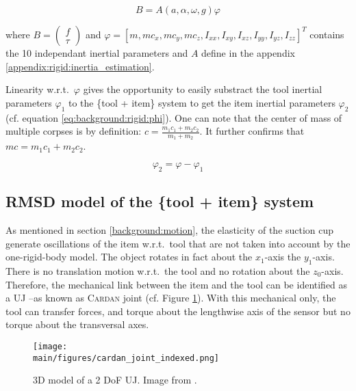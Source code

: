 \documentclass[/home/francois/latex/report/main.tex]{subfiles}
\begin{document}
\begin{equation}
  \label{background:eq:inertia_estimation}
B = A(a, \alpha, \omega, g) \varphi
\end{equation}

where $B =  \begin{pmatrix} f \\ \tau \end{pmatrix}$ and $\varphi = [m, m c_x, m c_y, m c_z, I_{xx}, I_{xy}, I_{xz}, I_{yy}, I_{yz}, I_{zz}]^T$ contains the 10 independant inertial parameters and $A$ define in the appendix \ref{appendix:rigid:inertia_estimation}.

Linearity w.r.t.\ $\varphi$ gives the opportunity to easily substract the tool inertial parameters $\varphi_1$ to the \{tool + item\} system to get the item inertial parameters $\varphi_2$ (cf. equation \ref{eq:background:rigid:phi}). One can note that the center of mass of multiple corpses is by definition: $c = \frac{m_1 c_1 + m_2 c_2}{m_1 + m_2}$. It further confirms that $mc = m_1 c_1 + m_2 c_2$.

\begin{equation}
  \label{eq:background:rigid:phi}
  \varphi_2 = \varphi - \varphi_{1}
\end{equation}


\subsection{\ac{RMSD} model of the \{tool + item\} system}

As mentioned in section \ref{background:motion}, the elasticity of the suction cup generate oscillations of the item w.r.t.\ tool that are not taken into account by the one-rigid-body model. The object rotates in fact about the $x_1$-axis the $y_1$-axis. There is no translation motion w.r.t.\ the tool and no rotation about the $z_0$-axis. Therefore, the mechanical link between the item and the tool can be identified as a \ac{UJ} –as known as \textsc{Cardan} joint (cf. Figure \ref{fig:background:cardan}). With this mechanical only, the tool can transfer forces, and torque about the lengthwise axis of the sensor but no torque about the transversal axes.

\begin{figure}[H]
  \centering
  \texttt{[image: \\main/figures/cardan\_joint\_indexed.png]}
  \caption{3D model of a 2 \ac{DoF} \ac{UJ}. Image from \cite{3dexport2020}.}
  \label{fig:background:cardan}
\end{figure}
\end{document}
